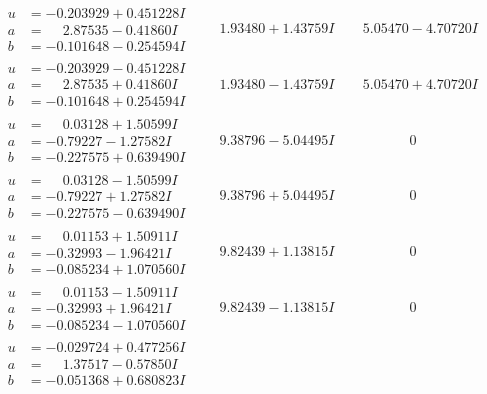 \documentclass[1p]{elsarticle_modified}
\theoremstyle{definition}
\begin{document}
$$\begin{array}{c|c|c}
\begin{aligned}
u &= -0.203929 + 0.451228 I \\
a &= \phantom{-}2.87535 - 0.41860 I \\
b &= -0.101648 - 0.254594 I\end{aligned}
 & \phantom{-}1.93480 + 1.43759 I & \phantom{-}5.05470 - 4.70720 I \\ \hline\begin{aligned}
u &= -0.203929 - 0.451228 I \\
a &= \phantom{-}2.87535 + 0.41860 I \\
b &= -0.101648 + 0.254594 I\end{aligned}
 & \phantom{-}1.93480 - 1.43759 I & \phantom{-}5.05470 + 4.70720 I \\ \hline\begin{aligned}
u &= \phantom{-}0.03128 + 1.50599 I \\
a &= -0.79227 - 1.27582 I \\
b &= -0.227575 + 0.639490 I\end{aligned}
 & \phantom{-}9.38796 - 5.04495 I & \phantom{-0.000000 } 0 \\ \hline\begin{aligned}
u &= \phantom{-}0.03128 - 1.50599 I \\
a &= -0.79227 + 1.27582 I \\
b &= -0.227575 - 0.639490 I\end{aligned}
 & \phantom{-}9.38796 + 5.04495 I & \phantom{-0.000000 } 0 \\ \hline\begin{aligned}
u &= \phantom{-}0.01153 + 1.50911 I \\
a &= -0.32993 - 1.96421 I \\
b &= -0.085234 + 1.070560 I\end{aligned}
 & \phantom{-}9.82439 + 1.13815 I & \phantom{-0.000000 } 0 \\ \hline\begin{aligned}
u &= \phantom{-}0.01153 - 1.50911 I \\
a &= -0.32993 + 1.96421 I \\
b &= -0.085234 - 1.070560 I\end{aligned}
 & \phantom{-}9.82439 - 1.13815 I & \phantom{-0.000000 } 0 \\ \hline\begin{aligned}
u &= -0.029724 + 0.477256 I \\
a &= \phantom{-}1.37517 - 0.57850 I \\
b &= -0.051368 + 0.680823 I\end{aligned}

\end{array}$$
\end{document}
